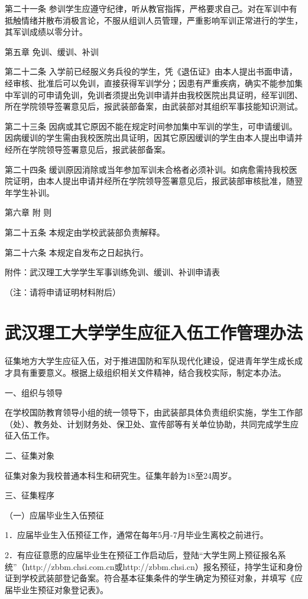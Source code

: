 \documentclass[UTF8,12pt,a4paper]{report}
\begin{document}
第二十一条 参训学生应遵守纪律，听从教官指挥，严格要求自己。对在军训中有抵触情绪并散布消极言论，不服从组训人员管理，严重影响军训正常进行的学生，其军训成绩以零分计。

第五章 免训、缓训、补训

第二十二条 入学前已经服义务兵役的学生，凭《退伍证》由本人提出书面申请，经审核、批准后可以免训，直接获得军训学分；因患有严重疾病，确实不能参加集中军训的可申请免训，免训者须提出免训申请并由我校医院出具证明，经军训团、所在学院领导签署意见后，报武装部备案，由武装部对其组织军事技能知识测试。

第二十三条 因病或其它原因不能在规定时间参加集中军训的学生，可申请缓训。因病缓训的学生需由我校医院出具证明，因其它原因缓训的学生由本人提出申请并经所在学院领导签署意见后，报武装部备案。

第二十四条 缓训原因消除或当年参加军训未合格者必须补训。如病愈需持我校医院证明，由本人提出申请并经所在学院领导签署意见后，报武装部审核批准，随翌年学生补训。

第六章 附 则

第二十五条 本规定由学校武装部负责解释。

第二十六条 本规定自发布之日起执行。

附件：武汉理工大学学生军事训练免训、缓训、补训申请表

（注：请将申请证明材料附后）

\chapter{武汉理工大学学生应征入伍工作管理办法}
征集地方大学生应征入伍，对于推进国防和军队现代化建设，促进青年学生成长成才具有重要意义。根据上级组织相关文件精神，结合我校实际，制定本办法。

一、组织与领导

在学校国防教育领导小组的统一领导下，由武装部具体负责组织实施，学生工作部（处）、教务处、计划财务处、保卫处、宣传部等有关单位协助，共同完成学生应征入伍工作。

二、征集对象

征集对象为我校普通本科生和研究生。征集年龄为18至24周岁。

三、征集程序

（一）应届毕业生入伍预征

1．应届毕业生入伍预征工作，通常在每年5月-7月毕业生离校之前进行。

2．有应征意愿的应届毕业生在预征工作启动后，登陆“大学生网上预征报名系统”（http://zbbm.chsi.com.cn或http://zbbm.chsi.cn）报名预征，持学生证和身份证到学校武装部登记备案。符合基本征集条件的学生确定为预征对象，并填写《应届毕业生预征对象登记表》。
\end{document}
